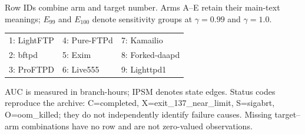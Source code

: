 \begingroup
\small
\setlength{\tabcolsep}{1.6pt}
\renewcommand{\arraystretch}{1.0}
\noindent Row IDs combine arm and target number. Arms A--E retain their main-text meanings; $E_{99}$ and $E_{100}$ denote sensitivity groups at $\gamma=0.99$ and $\gamma=1.0$.
\par\smallskip
\noindent\begin{tabularx}{\columnwidth}{@{}YYY@{}}
1: LightFTP & 4: Pure-FTPd & 7: Kamailio \\
2: bftpd & 5: Exim & 8: Forked-daapd \\
3: ProFTPD & 6: Live555 & 9: Lighttpd1 \\
\end{tabularx}
\par\smallskip
\noindent AUC is measured in branch-hours; IPSM denotes state edges. Status codes reproduce the archive: C=completed, X=exit\_137\_near\_limit, S=sigabrt, O=oom\_killed; they do not independently identify failure causes. Missing target--arm combinations have no row and are not zero-valued observations.
\par\smallskip
{}
\label{tab:archive_arms}
\tabletail{\bottomrule}
\tablelasttail{\bottomrule}
